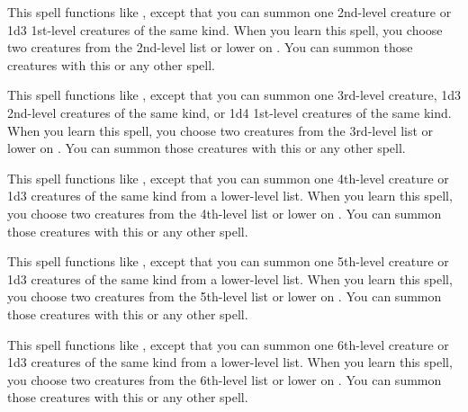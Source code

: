 \spelleffect This spell functions like , except that you can summon one 2nd-level creature or 1d3 1st-level creatures of the same kind. When you learn this spell, you choose two creatures from the 2nd-level list or lower on . You can summon those creatures with this or any other  spell.

\spelleffect This spell functions like , except that you can summon one 3rd-level creature, 1d3 2nd-level creatures of the same kind, or 1d4 1st-level creatures of the same kind. When you learn this spell, you choose two creatures from the 3rd-level list or lower on . You can summon those creatures with this or any other  spell.

\spelleffect This spell functions like , except that you can summon one 4th-level creature or 1d3 creatures of the same kind from a lower-level list. When you learn this spell, you choose two creatures from the 4th-level list or lower on . You can summon those creatures with this or any other  spell.

\spelleffect This spell functions like , except that you can summon one 5th-level creature or 1d3 creatures of the same kind from a lower-level list. When you learn this spell, you choose two creatures from the 5th-level list or lower on . You can summon those creatures with this or any other  spell.

\spelleffect This spell functions like , except that you can summon one 6th-level creature or 1d3 creatures of the same kind from a lower-level list. When you learn this spell, you choose two creatures from the 6th-level list or lower on . You can summon those creatures with this or any other  spell.

